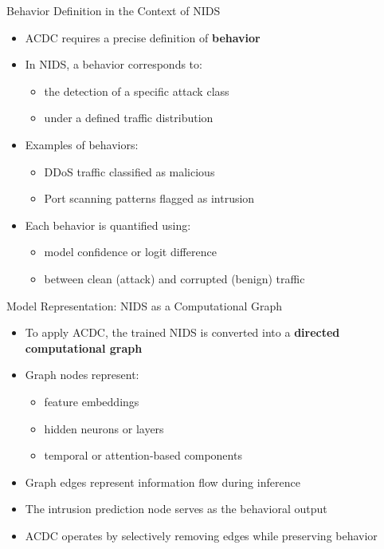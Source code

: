 \documentclass{beamer}
\begin{document}
	\begin{frame}{Behavior Definition in the Context of NIDS}
		\begin{itemize}
			\item ACDC requires a precise definition of \textbf{behavior}
			\item In NIDS, a behavior corresponds to:
			\begin{itemize}
				\item the detection of a specific attack class
				\item under a defined traffic distribution
			\end{itemize}
			\item Examples of behaviors:
			\begin{itemize}
				\item DDoS traffic classified as malicious
				\item Port scanning patterns flagged as intrusion
			\end{itemize}
			\item Each behavior is quantified using:
			\begin{itemize}
				\item model confidence or logit difference
				\item between clean (attack) and corrupted (benign) traffic
			\end{itemize}
		\end{itemize}
	\end{frame}
	
	\begin{frame}{Model Representation: NIDS as a Computational Graph}
		\begin{itemize}
			\item To apply ACDC, the trained NIDS is converted into a
			\textbf{directed computational graph}
			\item Graph nodes represent:
			\begin{itemize}
				\item feature embeddings
				\item hidden neurons or layers
				\item temporal or attention-based components
			\end{itemize}
			\item Graph edges represent information flow during inference
			\item The intrusion prediction node serves as the behavioral output
			\item ACDC operates by selectively removing edges while preserving behavior
		\end{itemize}
	\end{frame}
	
\end{document}
